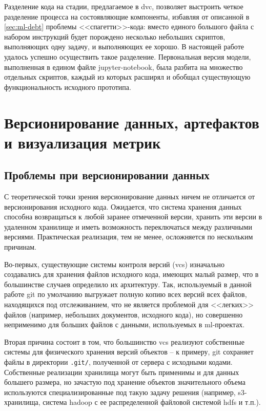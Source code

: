 Разделение кода на стадии, предлагаемое в \gls{dvc}, позволяет выстроить четкое разделение процесса на состоявляющие компоненты, избавляя от описанной в \ref{sec:ml-debt} проблемы <<спагетти>>-кода: вместо единого большого файла с набором инструкций будет порождено несколько небольших скриптов, выполняющих одну задачу, и выполняющих ее хорошо.
В настоящей работе удалось успешно осуществить такое разделение.
Первональная версия модели, выполненная в едином файле \gls{jupyter-notebook}, была разбита на множество отдельных скриптов, каждый из которых расширял и обобщал существующую функциональность исходного прототипа.
\section{Версионирование данных, артефактов и визуализация метрик}
\label{sec:dvc}

\subsection{Проблемы при версионировании данных}
\label{sec:dvc-versioning-problems}
С теоретической точки зрения версионирование данных ничем не отличается от версионирования исходного кода.
Ожидается, что система хранения данных способна возвращаться к любой заранее отмеченной версии, хранить эти версии в удаленном хранилище и иметь возможность переключаться между различными версиями.
Практическая реализация, тем не менее, осложняется по нескольким причинам.

Во-первых, существующие системы контроля версий (\acrlong{vcs}) изначально создавались для хранения файлов исходного кода, имеющих малый размер, что в большинстве случаев определило их архитектуру.
Так, используемый в данной работе \gls{git} по умолчанию выгружает полную копию всех версий всех файлов, находящихся под отслеживанием, что не является проблемой для <<легких>> файлов (например, небольших документов, исходного кода), но совершенно неприменимо для больших файлов с данными, используемых в \acrshort{ml}-проектах.

Вторая причина состоит в том, что большинство \acrshort{vcs} реализуют собственные системы для физического хранения версий объектов -- к примеру, \gls{git} сохраняет файлы в директории \texttt{.git/}, полученной от сервера с исходными кодами.
Собственные реализации хранилища могут быть применимы и для данных большего размера, но зачастую под хранение объектов значительного объема используются специализированные под такую задачу решения (например, \gls{s3}-хранилища, система \gls{hadoop} с ее распределенной файловой системой \gls{hdfs} и т.п.).

